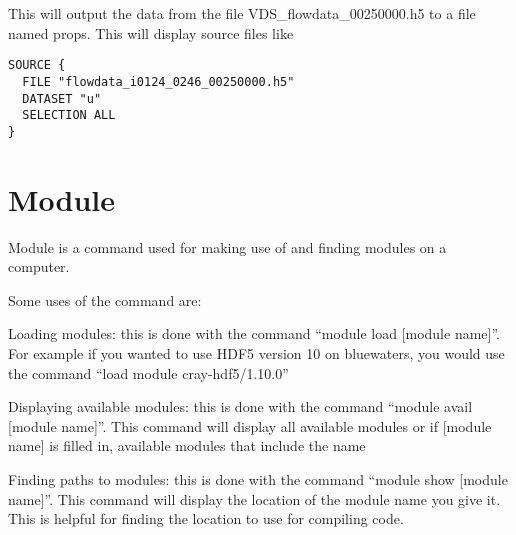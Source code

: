 \documentclass[12pt, oneside]{article}
\begin{document}
This will output the data from the file VDS\_flowdata\_00250000.h5 to a file named props. This will display source files like

\begin{verbatim}
SOURCE {
  FILE "flowdata_i0124_0246_00250000.h5"
  DATASET "u"
  SELECTION ALL
}
\end{verbatim}

\section{Module}

Module is a command used for making use of and finding modules on a computer.

\noindent Some uses of the command are:

Loading modules: this is done with the command    ``module load [module name]''.  For example if you wanted to use HDF5 version 10 on bluewaters, you would use the command
   ``load module cray-hdf5/1.10.0''
\newline
   
Displaying available modules: this is done with the command    ``module avail [module name]''.  This command will display all available modules or if [module name] is filled in, 
available modules that include the name
\newline

Finding paths to modules: this is done with the command    ``module show [module name]''.    This command will display the location of the module name you give it. This is helpful for finding 
the location to use for compiling code.
\end{document}
